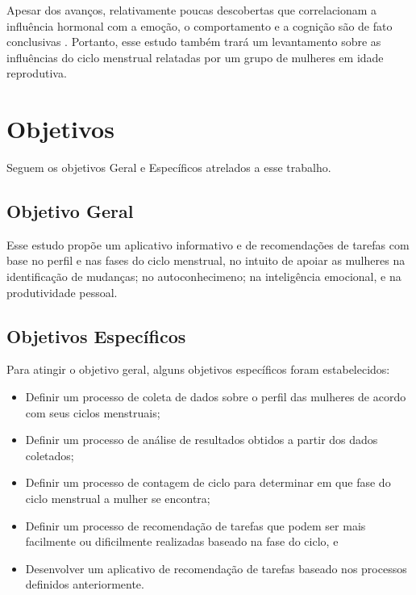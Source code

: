Apesar dos avanços, relativamente poucas descobertas que correlacionam a influência hormonal com a 
emoção, o comportamento e a cognição são de fato conclusivas \cite{poroma2014}. Portanto, esse estudo 
também trará um levantamento sobre as influências do ciclo menstrual relatadas por um grupo de mulheres 
em idade reprodutiva.


\section{Objetivos}

Seguem os objetivos Geral e Específicos atrelados a esse trabalho.

\subsection{Objetivo Geral}


Esse estudo propõe um aplicativo informativo e de recomendações de tarefas com base no perfil e 
nas fases do ciclo menstrual, no intuito de apoiar as mulheres na identificação de mudanças; 
no autoconhecimeno; na inteligência emocional, e na produtividade pessoal.


\subsection{Objetivos Específicos}

Para atingir o objetivo geral, alguns objetivos específicos foram estabelecidos:

\begin{itemize}

        \item Definir um processo de coleta de dados sobre o perfil das mulheres de acordo com seus ciclos menstruais;
        
        \item Definir um processo de análise de resultados obtidos a partir dos dados coletados;

        \item Definir um processo de contagem de ciclo para determinar em que fase do ciclo menstrual a mulher se encontra;

        \item Definir um processo de recomendação de tarefas que podem ser mais facilmente ou dificilmente realizadas baseado na fase do ciclo, e

        \item Desenvolver um aplicativo de recomendação de tarefas baseado nos processos definidos anteriormente.

\end{itemize}

